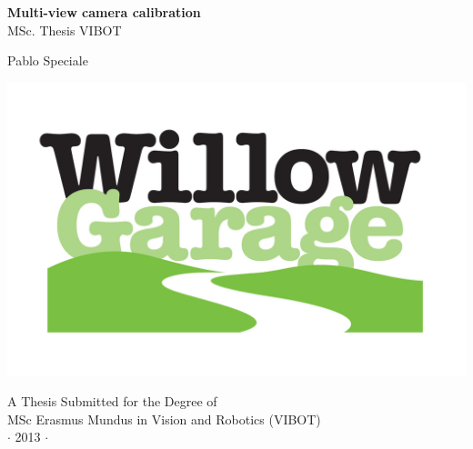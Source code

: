
\newpage
\thispagestyle{empty}


\vspace*{1cm}
\begin{center}
\huge{\bf Multi-view camera calibration} \\[0.5cm]
{\Large MSc. Thesis VIBOT\\} \vspace{2cm} {\large
Pablo Speciale\\
\vspace{1cm}

\includegraphics[height=0.20\textheight]{images/WG_logo_on_white.jpg}
}
\end{center}

\vspace{4cm}
\begin{center}
{\large A Thesis Submitted for the Degree of \\MSc Erasmus Mundus
in Vision and Robotics (VIBOT) \\\vspace{0.3cm} $\cdot$ 2013
$\cdot$}
\end{center}
\singlespacing









